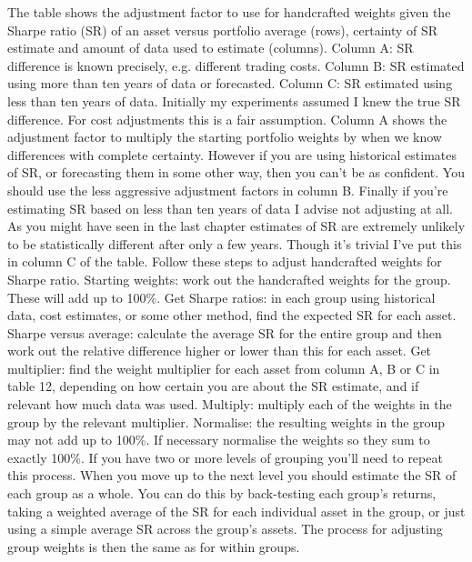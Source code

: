 \begin{englishblock} The table shows the adjustment factor to use for handcrafted weights given the Sharpe ratio (SR) of an asset versus portfolio average (rows), certainty of SR estimate and amount of data used to estimate (columns). Column A: SR difference is known precisely, e.g. different trading costs. Column B: SR estimated using more than ten years of data or forecasted. Column C: SR estimated using less than ten years of data. Initially my experiments assumed I knew the true SR difference. For cost adjustments this is a fair assumption. Column A shows the adjustment factor to multiply the starting portfolio weights by when we know differences with complete certainty. However if you are using historical estimates of SR, or forecasting them in some other way, then you can't be as confident. You should use the less aggressive adjustment factors in column B. Finally if you're estimating SR based on less than ten years of data I advise not adjusting at all. As you might have seen in the last chapter estimates of SR are extremely unlikely to be statistically different after only a few years. Though it's trivial I've put this in column C of the table. Follow these steps to adjust handcrafted weights for Sharpe ratio. Starting weights: work out the handcrafted weights for the group. These will add up to 100\%. Get Sharpe ratios: in each group using historical data, cost estimates, or some other method, find the expected SR for each asset. Sharpe versus average: calculate the average SR for the entire group and then work out the relative difference higher or lower than this for each asset. Get multiplier: find the weight multiplier for each asset from column A, B or C in table 12, depending on how certain you are about the SR estimate, and if relevant how much data was used. Multiply: multiply each of the weights in the group by the relevant multiplier. Normalise: the resulting weights in the group may not add up to 100\%. If necessary normalise the weights so they sum to exactly 100\%. If you have two or more levels of grouping you'll need to repeat this process. When you move up to the next level you should estimate the SR of each group as a whole. You can do this by back-testing each group's returns, taking a weighted average of the SR for each individual asset in the group, or just using a simple average SR across the group's assets. The process for adjusting group weights is then the same as for within groups. \end{englishblock}

